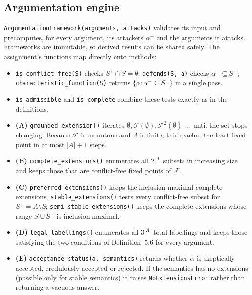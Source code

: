 \documentclass[11pt,a4paper]{article}
\newcommand{\code}[1]{{\let\origus\_\renewcommand{\_}{\origus\allowbreak}\texttt{#1}}}
\theoremstyle{definition}
\begin{document}
\subsection{Argumentation engine}

\code{ArgumentationFramework(arguments, attacks)} validates its input and precomputes, for every
argument, its attackers $\alpha^-$ and the arguments it attacks. Frameworks are immutable, so derived
results can be shared safely. The assignment's functions map directly onto methods:

\begin{itemize}
  \item \code{is\_conflict\_free(S)} checks $S^+\cap S=\emptyset$; \code{defends(S, a)} checks
        $\alpha^-\subseteq S^+$; \code{characteristic\_function(S)} returns
        $\{\alpha : \alpha^-\subseteq S^+\}$ in a single pass.
  \item \code{is\_admissible} and \code{is\_complete} combine these tests exactly as in the
        definitions.
  \item \textbf{(A)} \code{grounded\_extension()} iterates $\emptyset,\mathcal F(\emptyset),
        \mathcal F^2(\emptyset),\dots$ until the set stops changing. Because $\mathcal F$ is monotone
        and $A$ is finite, this reaches the least fixed point in at most $|A|+1$ steps.
  \item \textbf{(B)} \code{complete\_extensions()} enumerates all $2^{|A|}$ subsets in increasing size
        and keeps those that are conflict-free fixed points of $\mathcal F$.
  \item \textbf{(C)} \code{preferred\_extensions()} keeps the inclusion-maximal complete extensions;
        \code{stable\_extensions()} tests every conflict-free subset for $S^+=A\setminus S$;
        \code{semi\_stable\_extensions()} keeps the complete extensions whose range $S\cup S^+$ is
        inclusion-maximal.
  \item \textbf{(D)} \code{legal\_labellings()} enumerates all $3^{|A|}$ total labellings and keeps
        those satisfying the two conditions of Definition~5.6 for every argument.
  \item \textbf{(E)} \code{acceptance\_status(a, semantics)} returns whether $\alpha$ is skeptically
        accepted, credulously accepted or rejected. If the semantics has no extensions (possible
        only for stable semantics) it raises \code{NoExtensionsError} rather than returning a
        vacuous answer.
\end{itemize}
\end{document}

